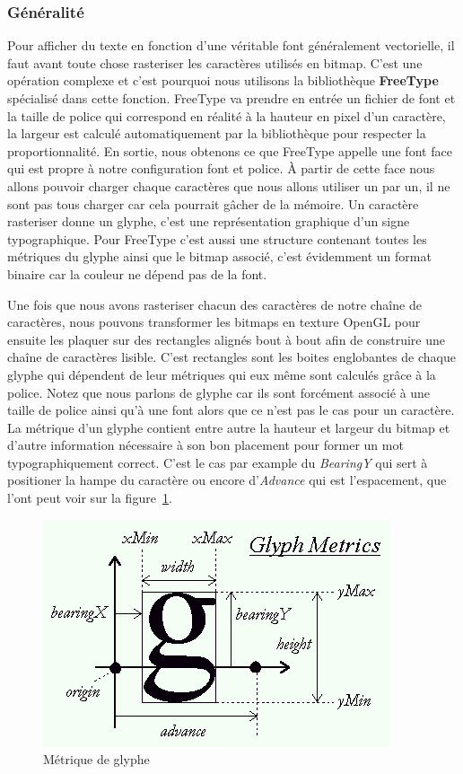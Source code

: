 \documentclass[12pt]{article}
\begin{document}
\subsubsection{Généralité}

Pour afficher du texte en fonction d'une véritable font généralement vectorielle, il faut avant toute chose rasteriser les caractères utilisés en bitmap.
C'est une opération complexe et c'est pourquoi nous utilisons la bibliothèque \textbf{FreeType} \cite{freetype-rs} spécialisé dans cette fonction.
FreeType va prendre en entrée un fichier de font et la taille de police qui correspond en réalité à la hauteur en pixel d'un caractère, la largeur est calculé automatiquement
par la bibliothèque pour respecter la proportionnalité. En sortie, nous obtenons ce que FreeType appelle une font face qui est propre à notre configuration font et police.
À partir de cette face nous allons pouvoir charger chaque caractères que nous allons utiliser un par un, il ne sont pas tous charger car cela pourrait gâcher de la mémoire.
Un caractère rasteriser donne un glyphe, c'est une représentation graphique d'un signe typographique. Pour FreeType c'est aussi une structure contenant toutes les métriques
du glyphe ainsi que le bitmap associé, c'est évidemment un format binaire car la couleur ne dépend pas de la font.

Une fois que nous avons rasteriser chacun des caractères de notre chaîne de caractères, nous pouvons transformer les bitmaps en texture OpenGL pour ensuite les plaquer
sur des rectangles alignés bout à bout afin de construire une chaîne de caractères lisible. C'est rectangles sont les boites englobantes de chaque glyphe qui dépendent
de leur métriques qui eux même sont calculés grâce à la police.
Notez que nous parlons de glyphe car ils sont forcément associé à une taille de police ainsi qu'à une font alors que ce n'est pas le cas pour un caractère.
La métrique d'un glyphe \cite{metrics} contient entre autre la hauteur et largeur du bitmap et d'autre information nécessaire à son bon placement pour former un mot typographiquement correct.
C'est le cas par example du \textit{BearingY} qui sert à positioner la hampe du caractère ou encore d'\textit{Advance} qui est l'espacement, que l'ont peut voir sur la figure~\ref{fig:metrics}.

\begin{figure}[htp]
  \centering
  \includegraphics[scale=0.8]{images/metrics}
  \caption{Métrique de glyphe}
  \label{fig:metrics}
\end{figure}
\end{document}
